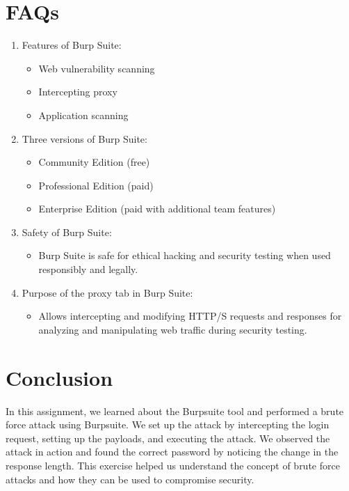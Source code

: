 \documentclass[11pt]{article}
\begin{document}
% 

\section*{FAQs}
\begin{enumerate}
    \item Features of Burp Suite:
    \begin{itemize}
        \item Web vulnerability scanning
        \item Intercepting proxy
        \item Application scanning
    \end{itemize}
    
    \item Three versions of Burp Suite:
    \begin{itemize}
        \item Community Edition (free)
        \item Professional Edition (paid)
        \item Enterprise Edition (paid with additional team features)
    \end{itemize}
    
    \item Safety of Burp Suite:
    \begin{itemize}
        \item Burp Suite is safe for ethical hacking and security testing when used responsibly and legally.
    \end{itemize}
    
    \item Purpose of the proxy tab in Burp Suite:
    \begin{itemize}
        \item Allows intercepting and modifying HTTP/S requests and responses for analyzing and manipulating web traffic during security testing.
    \end{itemize}
\end{enumerate}


\section{Conclusion}
In this assignment, we learned about the Burpsuite tool and performed a brute force attack using Burpsuite. We set up the attack by intercepting the login request, setting up the payloads, and executing the attack. We observed the attack in action and found the correct password by noticing the change in the response length. This exercise helped us understand the concept of brute force attacks and how they can be used to compromise security.
\clearpage

\pagebreak
\end{document}
